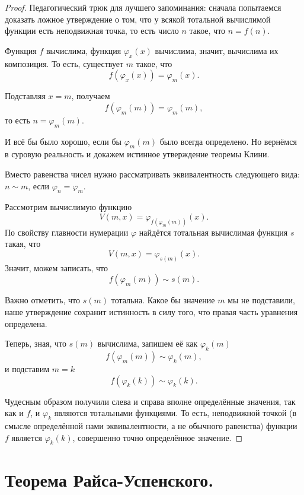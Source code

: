 \documentclass{article}
\begin{document}
    \begin{proof}
        Педагогический трюк для лучшего запоминания: сначала попытаемся доказать ложное утверждение
        о том, что у всякой тотальной вычислимой функции есть неподвижная точка, то есть число \(n\)
        такое, что \(n = f(n)\).

        Функция \(f\) вычислима, функция \(\varphi_x(x)\) вычислима, значит, вычислима их композиция. То
        есть, существует \(m\) такое, что
        \[
            f(\varphi_x(x)) = \varphi_m(x).
        \]

        Подставляя \(x = m\), получаем
        \[
            f(\varphi_m(m)) = \varphi_m(m),
        \]
        то есть \(n = \varphi_m(m)\).

        И всё бы было хорошо, если бы \(\varphi_m(m)\) было всегда определено. Но вернёмся в суровую
        реальность и докажем истинное утверждение теоремы Клини.

        Вместо равенства чисел нужно рассматривать эквивалентность следующего вида: \(n \sim m\),
        если \(\varphi_n = \varphi_m\).

        Рассмотрим вычислимую функцию \[V(m, x) = \varphi_{f(\varphi_m(m))}(x).\] По свойству главности
        нумерации \(\varphi\) найдётся тотальная вычислимая функция \(s\) такая, что \[V(m, x)
        = \varphi_{s(m)}(x).\] Значит, можем записать, что
        \[
            f(\varphi_m(m)) \sim s(m).
        \]

        Важно отметить, что \(s(m)\) тотальна. Какое бы значение \(m\) мы не подставили, наше
        утверждение сохранит истинность в силу того, что правая часть уравнения определена.

        Теперь, зная, что \(s(m)\) вычислима, запишем её как \(\varphi_k(m)\)
        \[
            f(\varphi_m(m)) \sim \varphi_k(m),
        \]
        и подставим \(m = k\)
        \[
            f(\varphi_k(k)) \sim \varphi_k(k).
        \]

        Чудесным образом получили слева и справа вполне определённые значения, так как и \(f\),
        и \(\varphi_k\) являются тотальными функциями. То есть, неподвижной точкой (в смысле
        определённой нами эквивалентности, а не обычного равенства) функции \(f\) является
        \(\varphi_k(k)\), совершенно точно определённое значение.
    \end{proof}

    \section{Теорема Райса-Успенского.}
\end{document}
